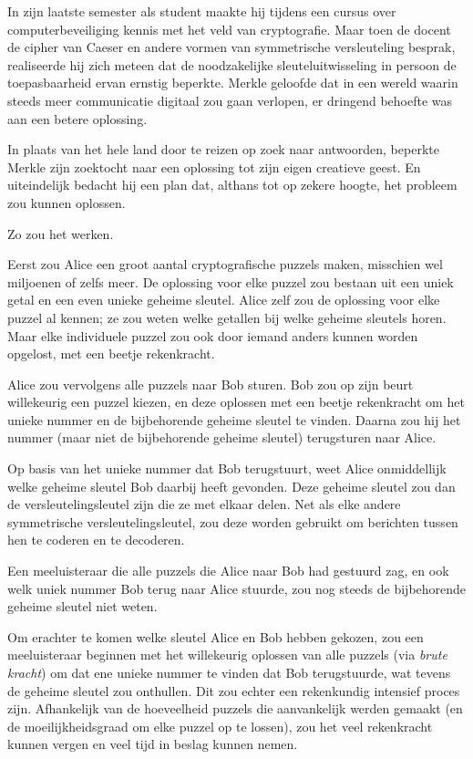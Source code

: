 \documentclass[smalldemyvopaper,11pt,twoside,onecolumn,openright,extrafontsizes,hidelinks]{memoir}
\begin{document}
In zijn laatste semester als student maakte hij tijdens een cursus over
computerbeveiliging kennis met het veld van cryptografie. Maar toen de
docent de cipher van Caeser en andere vormen van symmetrische
versleuteling besprak, realiseerde hij zich meteen dat de noodzakelijke
sleuteluitwisseling in persoon de toepasbaarheid ervan ernstig beperkte.
Merkle geloofde dat in een wereld waarin steeds meer communicatie
digitaal zou gaan verlopen, er dringend behoefte was aan een betere
oplossing.

In plaats van het hele land door te reizen op zoek naar antwoorden,
beperkte Merkle zijn zoektocht naar een oplossing tot zijn eigen
creatieve geest. En uiteindelijk bedacht hij een plan dat, althans tot
op zekere hoogte, het probleem zou kunnen oplossen.

Zo zou het werken.

Eerst zou Alice een groot aantal cryptografische puzzels maken,
misschien wel miljoenen of zelfs meer. De oplossing voor elke puzzel zou
bestaan uit een uniek getal en een even unieke geheime sleutel. Alice
zelf zou de oplossing voor elke puzzel al kennen; ze zou weten welke
getallen bij welke geheime sleutels horen. Maar elke individuele puzzel
zou ook door iemand anders kunnen worden opgelost, met een beetje
rekenkracht.

Alice zou vervolgens alle puzzels naar Bob sturen. Bob zou op zijn beurt
willekeurig een puzzel kiezen, en deze oplossen met een beetje
rekenkracht om het unieke nummer en de bijbehorende geheime sleutel te
vinden. Daarna zou hij het nummer (maar niet de bijbehorende geheime
sleutel) terugsturen naar Alice.

Op basis van het unieke nummer dat Bob terugstuurt, weet Alice
onmiddellijk welke geheime sleutel Bob daarbij heeft gevonden. Deze
geheime sleutel zou dan de versleutelingsleutel zijn die ze met elkaar
delen. Net als elke andere symmetrische versleutelingsleutel, zou deze
worden gebruikt om berichten tussen hen te coderen en te decoderen.

Een meeluisteraar die alle puzzels die Alice naar Bob had gestuurd zag,
en ook welk uniek nummer Bob terug naar Alice stuurde, zou nog steeds de
bijbehorende geheime sleutel niet weten.

Om erachter te komen welke sleutel Alice en Bob hebben gekozen, zou een
meeluisteraar beginnen met het willekeurig oplossen van alle puzzels
(via \emph{brute kracht}) om dat ene unieke nummer te vinden dat Bob
terugstuurde, wat tevens de geheime sleutel zou onthullen. Dit zou
echter een rekenkundig intensief proces zijn. Afhankelijk van de
hoeveelheid puzzels die aanvankelijk werden gemaakt (en de
moeilijkheidsgraad om elke puzzel op te lossen), zou het veel
rekenkracht kunnen vergen en veel tijd in beslag kunnen nemen.
\end{document}

